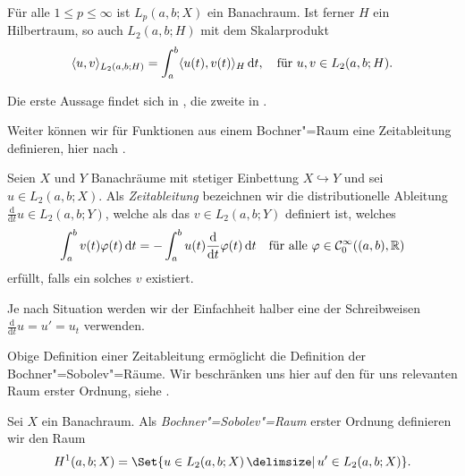 \begin{Lemma}
\label{lemma:bochnerraum_ist_banachraum_bzw_hilbertraum}
    Für alle $1 \leq p \leq \infty$ ist $L_{p}(a, b; X)$ ein Banachraum.
    Ist ferner $H$ ein Hilbertraum, so auch $L_{2}(a, b; H)$ mit dem Skalarprodukt
    \begin{equation}
        \skp{u}{v}{L_{2}(a, b; H)} = \int_{a}^{b} \skp{u(t)}{v(t)}{H} \diff t, \quad \text{für}~u,v \in L_{2}(a, b; H).
    \end{equation}

    \begin{Beweis}
        Die erste Aussage findet sich in \cite[Proposition XVIII.1.1]{Dautray:1992by}, die zweite in \cite[Abschnitt 1.1.3]{Lions:1972tg}.
    \end{Beweis}
\end{Lemma}

Weiter können wir für Funktionen aus einem Bochner"=Raum eine Zeitableitung definieren, hier nach \cites[471]{Dautray:1992by}[Definition 10.6]{Schweizer2013}.

\begin{Definition}[Zeitableitung]
\label{definition:zeitableitung}
    Seien $X$ und $Y$ Banachräume mit stetiger Einbettung $X \hookrightarrow Y$ und sei $u \in L_{2}(a, b; X)$.
    Als \emph{Zeitableitung} bezeichnen wir die distributionelle Ableitung $\frac{\mathrm{d}}{\mathrm{d} t} u \in L_{2}(a, b; Y)$, welche als das $v \in L_{2}(a, b; Y)$ definiert ist, welches
    \begin{equation}
        \int_{a}^{b} v(t) \varphi(t) \diff t = - \int_{a}^{b} u(t) \frac{\mathrm{d}}{\mathrm{d} t} \varphi(t) \diff t \quad \fa \varphi \in \mathcal C^{\infty}_{0}((a, b), \mathbb{R})
    \end{equation}
    erfüllt, falls ein solches $v$ existiert.
\end{Definition}

\begin{Bemerkung}
    Je nach Situation werden wir der Einfachheit halber eine der Schreibweisen $\frac{\mathrm{d}}{\mathrm{d} t} u = u' = u_{t}$ verwenden.
\end{Bemerkung}

Obige Definition einer Zeitableitung ermöglicht die Definition der Bochner"=Sobolev"=Räume.
Wir beschränken uns hier auf den für uns relevanten Raum erster Ordnung, siehe \cite[Section 5.9.2]{evans2010partial}.

\begin{Definition}
\label{definition:bochner_sobolev_raum}
    Sei $X$ ein Banachraum.
    Als \emph{Bochner"=Sobolev"=Raum} erster Ordnung definieren wir den Raum
    \begin{equation}
        H^{1}(a, b; X) = \Set{u \in L_{2}(a, b; X) \given u' \in L_{2}(a, b; X)}.
    \end{equation}
\end{Definition}

